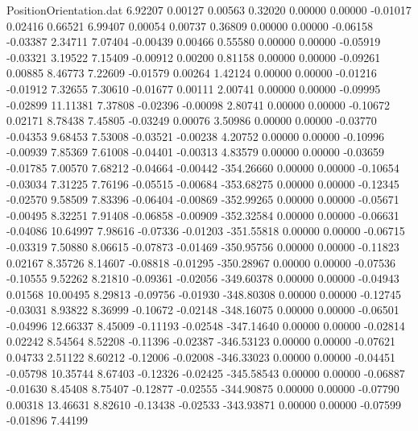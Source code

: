 \begin{filecontents}{PositionOrientation.dat}
   6.92207    0.00127    0.00563     0.32020    0.00000    0.00000   -0.01017    0.02416    0.66521
   6.99407    0.00054    0.00737     0.36809    0.00000    0.00000   -0.06158   -0.03387    2.34711
   7.07404   -0.00439    0.00466     0.55580    0.00000    0.00000   -0.05919   -0.03321    3.19522
   7.15409   -0.00912    0.00200     0.81158    0.00000    0.00000   -0.09261    0.00885    8.46773
   7.22609   -0.01579    0.00264     1.42124    0.00000    0.00000   -0.01216   -0.01912    7.32655
   7.30610   -0.01677    0.00111     2.00741    0.00000    0.00000   -0.09995   -0.02899   11.11381
   7.37808   -0.02396   -0.00098     2.80741    0.00000    0.00000   -0.10672    0.02171    8.78438
   7.45805   -0.03249    0.00076     3.50986    0.00000    0.00000   -0.03770   -0.04353    9.68453
   7.53008   -0.03521   -0.00238     4.20752    0.00000    0.00000   -0.10996   -0.00939    7.85369
   7.61008   -0.04401   -0.00313     4.83579    0.00000    0.00000   -0.03659   -0.01785    7.00570
   7.68212   -0.04664   -0.00442  -354.26660    0.00000    0.00000   -0.10654   -0.03034    7.31225
   7.76196   -0.05515   -0.00684  -353.68275    0.00000    0.00000   -0.12345   -0.02570    9.58509
   7.83396   -0.06404   -0.00869  -352.99265    0.00000    0.00000   -0.05671   -0.00495    8.32251
   7.91408   -0.06858   -0.00909  -352.32584    0.00000    0.00000   -0.06631   -0.04086   10.64997
   7.98616   -0.07336   -0.01203  -351.55818    0.00000    0.00000   -0.06715   -0.03319    7.50880
   8.06615   -0.07873   -0.01469  -350.95756    0.00000    0.00000   -0.11823    0.02167    8.35726
   8.14607   -0.08818   -0.01295  -350.28967    0.00000    0.00000   -0.07536   -0.10555    9.52262
   8.21810   -0.09361   -0.02056  -349.60378    0.00000    0.00000   -0.04943    0.01568   10.00495
   8.29813   -0.09756   -0.01930  -348.80308    0.00000    0.00000   -0.12745   -0.03031    8.93822
   8.36999   -0.10672   -0.02148  -348.16075    0.00000    0.00000   -0.06501   -0.04996   12.66337
   8.45009   -0.11193   -0.02548  -347.14640    0.00000    0.00000   -0.02814    0.02242    8.54564
   8.52208   -0.11396   -0.02387  -346.53123    0.00000    0.00000   -0.07621    0.04733    2.51122
   8.60212   -0.12006   -0.02008  -346.33023    0.00000    0.00000   -0.04451   -0.05798   10.35744
   8.67403   -0.12326   -0.02425  -345.58543    0.00000    0.00000   -0.06887   -0.01630    8.45408
   8.75407   -0.12877   -0.02555  -344.90875    0.00000    0.00000   -0.07790    0.00318   13.46631
   8.82610   -0.13438   -0.02533  -343.93871    0.00000    0.00000   -0.07599   -0.01896    7.44199

\end{filecontents}
